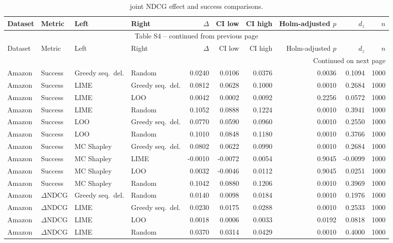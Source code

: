 \begin{longtable}{@{}p{}p{}p{}p{}rrrrrr@{}}
\caption{joint NDCG effect and success comparisons.}\label{tab:S4}\\
\toprule
Dataset & Metric & Left & Right & $\Delta$ & CI low & CI high & Holm-adjusted $p$ & $d_z$ & $n$ \\
\midrule
\endfirsthead
\multicolumn{10}{c}{Table S4 -- continued from previous page}\\
\toprule
Dataset & Metric & Left & Right & $\Delta$ & CI low & CI high & Holm-adjusted $p$ & $d_z$ & $n$ \\
\midrule
\endhead
\midrule
\multicolumn{10}{r}{Continued on next page}\\
\endfoot
\bottomrule
\endlastfoot
Amazon & Success & Greedy seq.\ del. & Random & 0.0240 & 0.0106 & 0.0376 & 0.0036 & 0.1094 & 1000 \\
Amazon & Success & LIME & Greedy seq.\ del. & 0.0812 & 0.0628 & 0.1000 & 0.0010 & 0.2684 & 1000 \\
Amazon & Success & LIME & LOO & 0.0042 & 0.0002 & 0.0092 & 0.2256 & 0.0572 & 1000 \\
Amazon & Success & LIME & Random & 0.1052 & 0.0888 & 0.1224 & 0.0010 & 0.3941 & 1000 \\
Amazon & Success & LOO & Greedy seq.\ del. & 0.0770 & 0.0590 & 0.0960 & 0.0010 & 0.2550 & 1000 \\
Amazon & Success & LOO & Random & 0.1010 & 0.0848 & 0.1180 & 0.0010 & 0.3766 & 1000 \\
Amazon & Success & MC Shapley & Greedy seq.\ del. & 0.0802 & 0.0622 & 0.0990 & 0.0010 & 0.2684 & 1000 \\
Amazon & Success & MC Shapley & LIME & -0.0010 & -0.0072 & 0.0054 & 0.9045 & -0.0099 & 1000 \\
Amazon & Success & MC Shapley & LOO & 0.0032 & -0.0046 & 0.0112 & 0.9045 & 0.0251 & 1000 \\
Amazon & Success & MC Shapley & Random & 0.1042 & 0.0880 & 0.1206 & 0.0010 & 0.3969 & 1000 \\
Amazon & $\Delta$NDCG & Greedy seq.\ del. & Random & 0.0140 & 0.0098 & 0.0184 & 0.0010 & 0.1976 & 1000 \\
Amazon & $\Delta$NDCG & LIME & Greedy seq.\ del. & 0.0230 & 0.0175 & 0.0288 & 0.0010 & 0.2533 & 1000 \\
Amazon & $\Delta$NDCG & LIME & LOO & 0.0018 & 0.0006 & 0.0033 & 0.0192 & 0.0818 & 1000 \\
Amazon & $\Delta$NDCG & LIME & Random & 0.0370 & 0.0314 & 0.0429 & 0.0010 & 0.4000 & 1000 \\

\end{longtable}
